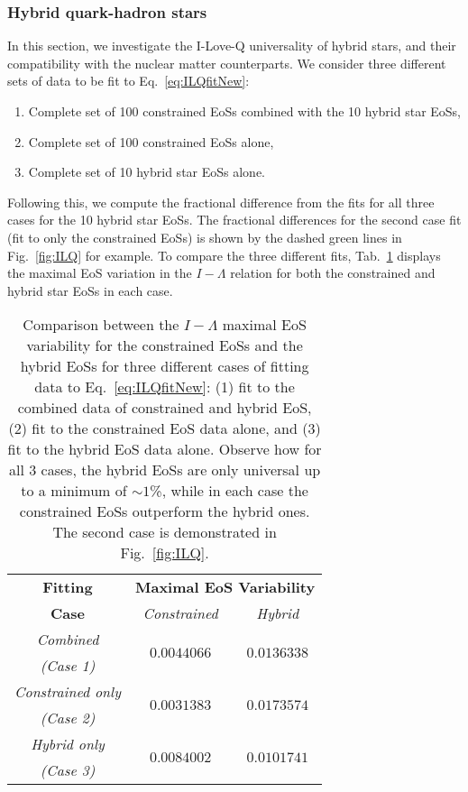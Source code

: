 \documentclass[prd,twocolumn,nofootinbib,superscriptaddress,amsmath,amssymb]{revtex4-1}
\begin{document}
\subsubsection{Hybrid quark-hadron stars}\label{sec:ilq-hyb}
In this section, we investigate the I-Love-Q universality of hybrid stars, and their compatibility with the nuclear matter counterparts.
We consider three different sets of data to be fit to Eq.~\ref{eq:ILQfitNew}:
\begin{enumerate}
\item Complete set of 100 constrained EoSs combined with the 10 hybrid star EoSs,
\item Complete set of 100 constrained EoSs alone,
\item Complete set of 10 hybrid star EoSs alone.
\end{enumerate}
Following this, we compute the fractional difference from the fits for all three cases for the 10 hybrid star EoSs.
The fractional differences for the second case fit (fit to only the constrained EoSs) is shown by the dashed green lines in Fig.~\ref{fig:ILQ} for example.
To compare the three different fits, Tab.~\ref{tab:hybridCompare} displays the maximal EoS variation in the $I-\Lambda$ relation for both the constrained and hybrid star EoSs in each case.

\begin{table}
\centering
\caption{
Comparison between the $I-\Lambda$ maximal EoS variability for the constrained EoSs and the hybrid EoSs for three different cases of fitting data to Eq.~\ref{eq:ILQfitNew}: (1) fit to the combined data of constrained and hybrid EoS, (2) fit to the constrained EoS data alone, and (3) fit to the hybrid EoS data alone.
Observe how for all 3 cases, the hybrid EoSs are only universal up to a minimum of $\sim1$\%, while in each case the constrained EoSs outperform the hybrid ones.
The second case is demonstrated in Fig.~\ref{fig:ILQ}.
}\label{tab:hybridCompare}
\begin{tabular}{ c  || c c } 
 \hline
 \hline
 \textbf{Fitting} & \multicolumn{2}{c}{\textbf{Maximal EoS Variability}} \\
 \cline{2-3}
 \textbf{Case} &  \multicolumn{1}{c|}{\emph{Constrained}} & \emph{Hybrid}\\
 \hline
 \emph{Combined} &  \multirow{2}{*}{$0.0044066$} & \multirow{2}{*}{$0.0136338$}\\
 \emph{(Case 1)} & &\\
 \cline{1-1}
 \emph{Constrained only} & \multirow{2}{*}{$0.0031383$} & \multirow{2}{*}{$0.0173574$}\\
  \emph{(Case 2)} & &\\
  \cline{1-1}
 \emph{Hybrid only} & \multirow{2}{*}{$0.0084002$} & \multirow{2}{*}{$0.0101741$}\\
  \emph{(Case 3)} & &\\
  \cline{1-1}
\hline
\hline
\end{tabular}
\end{table}
\end{document}
